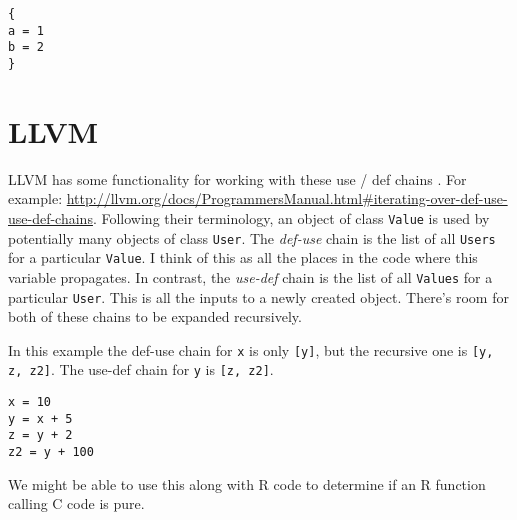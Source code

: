 \documentclass[12pt]{article}
\begin{document}
\begin{verbatim}
{
a = 1
b = 2
}
\end{verbatim}

\section{LLVM}

LLVM has some functionality for working with these use / def chains
\cite{Lattner2004}. For example:
\url{http://llvm.org/docs/ProgrammersManual.html#iterating-over-def-use-use-def-chains}.
Following their terminology, an object of class \texttt{Value} is used by
potentially many objects of class \texttt{User}. The \emph{def-use} chain
is the list of all \texttt{Users} for a particular \texttt{Value}. I think
of this as all the places in the code where this variable propagates. In
contrast, the \emph{use-def} chain is the list of all \texttt{Values} for a
particular \texttt{User}. This is all the inputs to a newly
created object. There's room for both of these chains to be expanded recursively.

In this example the def-use chain for \texttt{x} is only \texttt{[y]}, but the
recursive one is \texttt{[y, z, z2]}. The use-def chain for \texttt{y} is
\texttt{[z, z2]}.

\begin{verbatim}
x = 10
y = x + 5
z = y + 2
z2 = y + 100
\end{verbatim}

We might be able to use this along with R code to determine if an R
function calling C code is pure.



 
\end{document}
